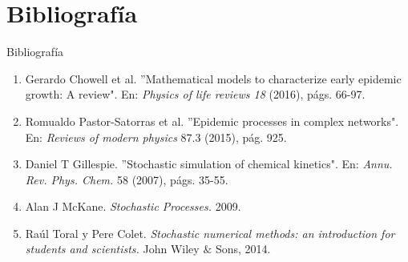 \documentclass[fontsize=11bp]{beamer}
\begin{document}
\section*{Bibliografía}
\begin{frame}{Bibliografía}
    \begin{enumerate}
        \item Gerardo Chowell et al. ''Mathematical models to characterize early epidemic
        growth: A review". En: \textit{Physics of life reviews 18} (2016), págs. 66-97.
        \item Romualdo Pastor-Satorras et al. ''Epidemic processes in complex networks". En:\textit{
        Reviews of modern physics} 87.3 (2015), pág. 925.
        \item Daniel T Gillespie. ''Stochastic simulation of chemical kinetics". En: \textit{Annu. Rev.
        Phys. Chem.} 58 (2007), págs. 35-55.
        \item Alan J McKane. \textit{Stochastic Processes.} 2009.
        \item Raúl Toral y Pere Colet. \textit{Stochastic numerical methods: an introduction for students and scientists.} John Wiley $\&$ Sons, 2014.
    \end{enumerate}
\end{frame}


\end{document}
